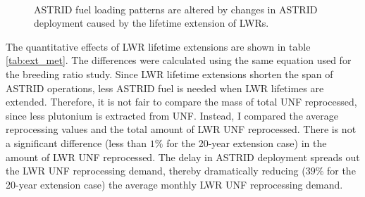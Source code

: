 \begin{figure}[!ht]
	\centering
	\quad
	\\
	\quad
	\caption{\gls{ASTRID} fuel loading patterns are altered by changes in \gls{ASTRID} deployment
			 caused by the lifetime extension of \glspl{LWR}.}
	\label{fig:ext_fuel}
\end{figure}

The quantitative effects of
\gls{LWR} lifetime extensions are shown in table \ref{tab:ext_met}.
The differences were calculated using the same equation used for the
breeding ratio study. 
Since \gls{LWR} lifetime extensions shorten the span of \gls{ASTRID} operations, less \gls{ASTRID} fuel is needed when \gls{LWR} lifetimes are extended.
Therefore, it is not fair to compare the mass of total \gls{UNF} reprocessed,
since less plutonium is extracted from \gls{UNF}. Instead, I compared the
average reprocessing values and the total amount of \gls{LWR} \gls{UNF} reprocessed.
There is not a significant difference (less than $1\%$ for the 20-year extension case)
in the amount of \gls{LWR}
\gls{UNF} reprocessed. The delay in \gls{ASTRID} deployment
spreads out the \gls{LWR} \gls{UNF} reprocessing demand,
thereby dramatically reducing ($39\%$ for the 20-year extension case)
the average monthly \gls{LWR} \gls{UNF} reprocessing demand.

